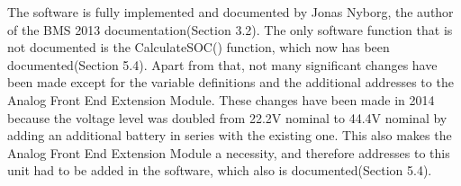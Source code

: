 The software is fully implemented and documented by Jonas Nyborg, the author of the BMS 2013 documentation\cite{BMSDocumentation}(Section 3.2). The only software function that is not documented is the CalculateSOC() function, which now has been documented\cite{AU2}(Section 5.4). Apart from that, not many significant changes have been made except for the variable definitions and the additional addresses to the Analog Front End Extension Module. These changes have been made in 2014 because the voltage level was doubled from 22.2V nominal to 44.4V nominal by adding an additional battery in series with the existing one. This also makes the Analog Front End Extension Module a necessity, and therefore addresses to this unit had to be added in the software, which also is documented\cite{AU2}(Section 5.4).   